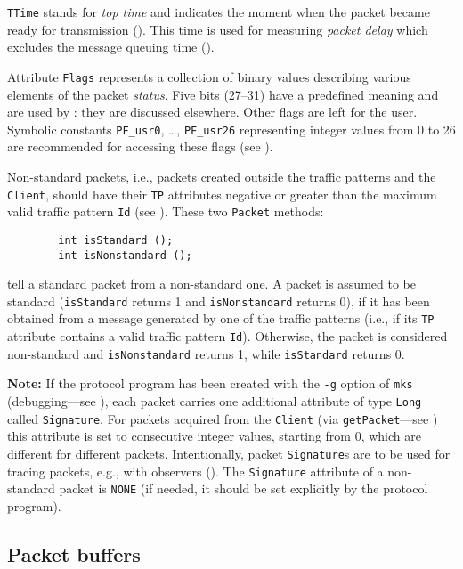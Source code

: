 {\tt TTime} stands for {\em top time\/} and indicates the moment when the
packet became ready for transmission ().
This time is used for measuring {\em packet delay\/} which excludes the message
queuing time ().

Attribute {\tt Flags} represents a collection of binary values describing
various elements of the packet {\em status}.
Five bits (27--31) have a predefined meaning and are used by \smurph: they are
discussed elsewhere.
Other flags are left for the user.
Symbolic constants {\tt PF\_usr0}, \ldots , {\tt PF\_usr26}
representing integer values from 0 to 26 are recommended for accessing
these flags (see ).

Non-standard packets, i.e.,
packets created outside the traffic patterns and the
{\tt Client}, should have their {\tt TP} attributes negative or greater
than the maximum valid traffic pattern {\tt Id} (see ).
These two {\tt Packet} methods:
\begin{verbatim}
        int isStandard ();
        int isNonstandard ();
\end{verbatim}
tell a standard packet from a non-standard one.
A packet is assumed to be standard ({\tt isStandard} returns 1 and
{\tt isNonstandard} returns 0), if it has
been obtained from a
message generated by one of the traffic patterns (i.e.,
if its {\tt TP} attribute
contains a valid traffic pattern {\tt Id}).
Otherwise, the packet is considered non-standard and {\tt isNonstandard}
returns 1, while {\tt isStandard} returns 0.

\medskip

\noindent
{\bf Note:} If the protocol program has been created with the 
{\tt -g} option of {\tt mks} (debugging---see ), each packet
carries one additional attribute of type {\tt Long} called {\tt Signature}.
For packets acquired from the {\tt Client} (via {\tt getPacket}---see
) this attribute is set to consecutive integer values,
starting from 0, which are different for different packets.
Intentionally, packet {\tt Signature}s are to be used for tracing
packets, e.g., with observers ().
The {\tt Signature} attribute of a non-standard packet is {\tt NONE}
(if needed, it should be set explicitly by the protocol program).

\subsection{Packet buffers}
\label{rm_cl_pb}

